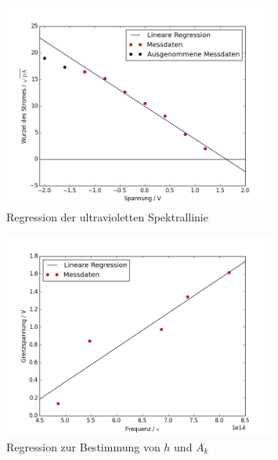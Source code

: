 \begin{figure}[h!]
	\centering
	\includegraphics[width=0.8\textwidth]{build/regression_Farbe:4.png}
	\caption{Regression der ultravioletten Spektrallinie}
	\label{fig:regression_uv}
\end{figure}

\begin{figure}[h!]
\centering
\includegraphics[width=0.8\textwidth]{build/regression_aufgabe2.png}
\caption{Regression zur Bestimmung von $h$ und $A_k$}
\label{fig:regression2}
\end{figure}


\clearpage

